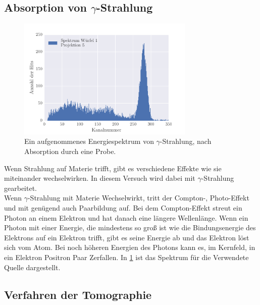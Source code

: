 \subsection{Absorption von $\gamma$-Strahlung}
\begin{figure}[h!]
	\centering
	\includegraphics[width = 0.75\textwidth]{../Grafiken/Spektrum_Block_1_Messung_5_0_350_histogram.pdf}
	\caption{Ein aufgenommenes Energiespektrum von $\gamma$-Strahlung, nach Absorption durch eine Probe.}\label{fig:EnergieSpektrum}
\end{figure}
Wenn Strahlung auf Materie trifft, gibt es verschiedene Effekte wie sie miteinander wechselwirken. 
In diesem Versuch wird dabei mit $\gamma$-Strahlung gearbeitet.\\
Wenn $\gamma$-Strahlung mit Materie Wechselwirkt, tritt der Compton-, Photo-Effekt und mit genügend auch Paarbildung auf.
Bei dem Compton-Effekt streut ein Photon an einem Elektron und hat danach eine längere Wellenlänge.
Wenn ein Photon mit einer Energie, die mindestens so groß ist wie die Bindungsenergie des Elektrons auf ein Elektron trifft, gibt es seine Energie ab und das Elektron löst sich vom Atom.
Bei noch höheren Energien des Photons kann es, im Kernfeld, in ein Elektron Positron Paar Zerfallen.
In \cref{fig:EnergieSpektrum} ist das Spektrum für die Verwendete Quelle dargestellt.  


\subsection{Verfahren der Tomographie}

